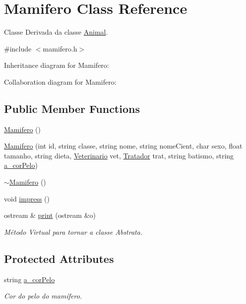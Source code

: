 \hypertarget{classMamifero}{}\section{Mamifero Class Reference}
\label{classMamifero}


Classe Derivada da classe \hyperlink{classAnimal}{Animal}.  




{\ttfamily \#include $<$mamifero.\+h$>$}



Inheritance diagram for Mamifero\+:


Collaboration diagram for Mamifero\+:
\subsection*{Public Member Functions}
\begin{DoxyCompactItemize}
\item 
\hyperlink{classMamifero_adc6af2531b40fb6b0bc91cb5bbb205e8}{Mamifero} ()
\item 
\hyperlink{classMamifero_a129e77203cb5ef91e729913271abd6b7}{Mamifero} (int id, string classe, string nome, string nome\+Cient, char sexo, float tamanho, string dieta, \hyperlink{classVeterinario}{Veterinario} vet, \hyperlink{classTratador}{Tratador} trat, string batismo, string \hyperlink{classMamifero_a7fed480798de8d55d17b3fd8cfdb24fb}{a\+\_\+cor\+Pelo})
\item 
\hyperlink{classMamifero_a56eb196d45222e754eb6f19000667d5d}{$\sim$\+Mamifero} ()
\item 
void \hyperlink{classMamifero_aece8169f76ded941f520741fd922cdab}{impress} ()
\item 
ostream \& \hyperlink{classMamifero_a717d161cbc6b3392db3faa2554f5bfa2}{print} (ostream \&o)
\begin{DoxyCompactList}\small\item\em Método Virtual para tornar a classe Abstrata. \end{DoxyCompactList}\end{DoxyCompactItemize}
\subsection*{Protected Attributes}
\begin{DoxyCompactItemize}
\item 
string \hyperlink{classMamifero_a7fed480798de8d55d17b3fd8cfdb24fb}{a\+\_\+cor\+Pelo}
\begin{DoxyCompactList}\small\item\em Cor do pelo do mamífero. \end{DoxyCompactList}\end{DoxyCompactItemize}


